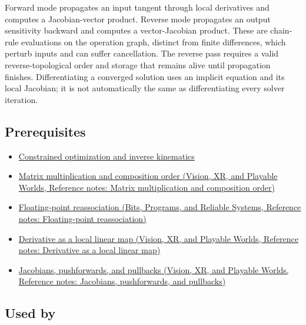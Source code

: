 \hypertarget{appendix-40df0855b4a7-phase-910-development}{}

Forward mode propagates an input tangent through local derivatives and computes a Jacobian-vector product. Reverse mode propagates an output sensitivity backward and computes a vector-Jacobian product. These are chain-rule evaluations on the operation graph, distinct from finite differences, which perturb inputs and can suffer cancellation. The reverse pass requires a valid reverse-topological order and storage that remains alive until propagation finishes. Differentiating a converged solution uses an implicit equation and its local Jacobian; it is not automatically the same as differentiating every solver iteration.

\subsection{Prerequisites}\label{appendix-40df0855b4a7-prerequisites}

\hypertarget{appendix-40df0855b4a7-prerequisites}{}

\begin{itemize}
\tightlist
\item
  \hyperref[appendix-29f4bea4c2bb]{Constrained optimization and inverse kinematics}
\item
  \href{../07-Vision-XR-and-Playable-Worlds/main.pdf\#nameddest=appendix-ab31ef447dbf}{Matrix multiplication and composition order (Vision, XR, and Playable Worlds, Reference notes: Matrix multiplication and composition order)}
\item
  \href{../01-Bits-Programs-and-Reliable-Systems/main.pdf\#nameddest=appendix-c2ac4a84c283}{Floating-point reassociation (Bits, Programs, and Reliable Systems, Reference notes: Floating-point reassociation)}
\item
  \href{../07-Vision-XR-and-Playable-Worlds/main.pdf\#nameddest=appendix-7bc181935c42}{Derivative as a local linear map (Vision, XR, and Playable Worlds, Reference notes: Derivative as a local linear map)}
\item
  \href{../07-Vision-XR-and-Playable-Worlds/main.pdf\#nameddest=appendix-d8a7ddb675eb}{Jacobians, pushforwards, and pullbacks (Vision, XR, and Playable Worlds, Reference notes: Jacobians, pushforwards, and pullbacks)}
\end{itemize}

\subsection{Used by}\label{appendix-40df0855b4a7-used-by}


